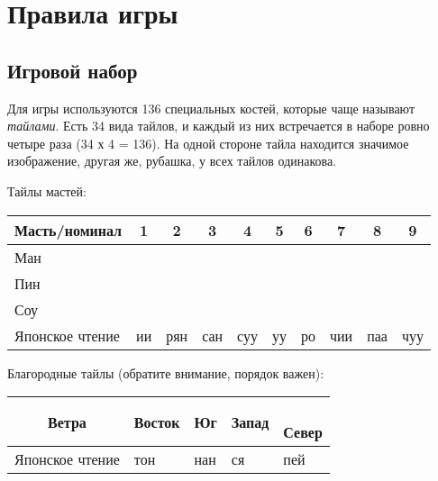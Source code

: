 \section{Правила игры}

\subsection{Игровой набор}

Для игры используются 136 специальных костей, которые чаще называют \textit{тайлами}. Есть 34 вида тайлов, и каждый из них встречается в наборе ровно четыре раза (34 х 4 = 136). На одной стороне тайла находится значимое изображение, другая же, рубашка, у всех тайлов одинакова.

Тайлы мастей:

\begin{tabular}{ |C{3.5cm}|c|c|c|c|c|c|c|c|c| } 
	\hline
	Масть/номинал & 1 & 2 & 3 & 4 & 5 & 6 & 7 & 8 & 9 \\
	\hline
	Ман \newline &  &  &  &  &  &  &  &  &  \rule[1ex]{0pt}{7ex} \\
	\hline
	Пин \newline &  &  &  &  &  &  &  &  &  \rule[1ex]{0pt}{7ex} \\
	\hline
	Соу \newline &  &  &  &  &  &  &  &  &  \rule[1ex]{0pt}{7ex} \\
	\hline
	Японское чтение & ии & рян & сан & суу & уу & ро & чии & паа & чуу \\
	\hline 
\end{tabular}


Благородные тайлы (обратите внимание, порядок важен):

\begin{tabular}{ |c|C{2cm}|C{2cm}|C{2cm}|C{2cm}| } 
	\hline
	 \rule[0ex]{0pt}{7ex} Ветра &  \newline Восток &  \newline Юг &  \newline Запад & { \newline Север} \\
	\hline
	Японское чтение & тон & нан & ся & пей \\
	\hline
\end{tabular}


